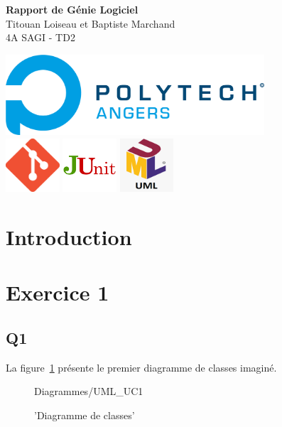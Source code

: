 \documentclass[12pt]{article}
\begin{document}
\begin{titlepage}
    \begin{center}
        \textbf{Rapport de Génie Logiciel} \\
        \vspace{0.5cm}
        Titouan Loiseau et Baptiste Marchand \\
        4A SAGI - TD2 \\
        \vspace{5cm}

        \includegraphics[height=3cm]{img/Polytech_Angers.png} \\
        \includegraphics[height=2cm]{img/git.png}
        \includegraphics[height=2cm]{img/junit.png}
        \includegraphics[height=2cm]{img/uml.png}
    \end{center}
\end{titlepage}

\tableofcontents
\pagebreak

\section*{Introduction}

\section{Exercice 1}
\subsection{Q1}

La figure~\ref{UC1} présente le premier diagramme de classes imaginé. 

\begin{figure}[h]
    {Diagrammes/UML_UC1}
    \caption{'Diagramme de classes'\label{UC1}}
\end{figure}
\end{document}

